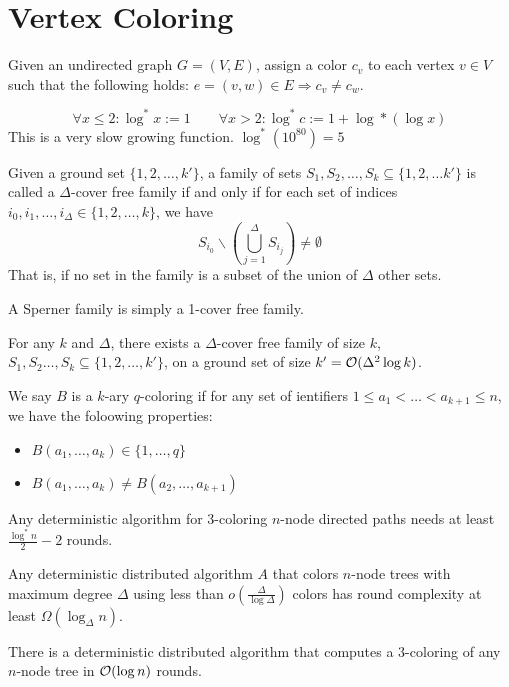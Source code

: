 \documentclass[11pt, oneside]{book}   						%
\begin{document}
\section{Vertex Coloring}
\begin{mydef} Given an undirected graph $G=(V,E)$, assign a color $c_v$ to each vertex $v \in V$ such that the following holds: $e=(v,w) \in E \Rightarrow c_v \neq c_w$.\end{mydef}
\begin{mydef}[$\log^*$] $$\forall x\le 2: \log^*x :=1 \qquad \forall x > 2: \log^*c:= 1+\log*(\log x)$$
This is a very slow growing function. $\log^*(10^{80}) = 5$\end{mydef}
\begin{mydef} Given a ground set $\{1,2, \hdots, k'\}$, a family of sets $S_1,S_2,\hdots,S_k\subseteq\{1,2,\hdots k'\}$ is called a $\Delta$-cover free family if and only if for each set of indices $i_0,i_1,\hdots, i_\Delta\in \{1,2,\hdots,k\}$, we have 
	$$S_{i_0}\backslash \left(\bigcup_{j=1}^\Delta S_{i_j}\right)\neq \emptyset$$
That is, if no set in the family is a subset of the union of $\Delta$ other sets.\end{mydef}
\begin{mydef} A Sperner family is simply a 1-cover free family.\end{mydef}
\begin{mythm}For any $k$ and $\Delta$, there exists a $\Delta$-cover free family of size $k$, $S_1, S_2\hdots,S_k \subseteq\{1,2,\hdots, k'\}$, on a ground set of size $k'=\mathcal{O}(\Delta^2\log k)$.\end{mythm}
\begin{mydef} We say $B$ is a $k$-ary $q$-coloring if for any set of ientifiers $1\le a_1<\hdots<a_{k+1}\le n$, we have the foloowing properties:
\begin{itemize}
	\item $B(a_1,\hdots, a_k)\in \{1,\hdots, q\}$
	\item $B(a_1, \hdots, a_k)\neq B(a_2,\hdots, a_{k+1})$
\end{itemize}\end{mydef}
\begin{mythm} Any deterministic algorithm for 3-coloring $n$-node directed paths needs at least $\frac{\log^*n}{2}-2$ rounds.\end{mythm}
\begin{mythm} Any deterministic distributed algorithm $A$ that colors $n$-node trees with maximum degree $\Delta$ using less than $o(\frac{\Delta}{\log\Delta})$ colors has round complexity at least $\Omega(\log_\Delta n)$.\end{mythm}
\begin{mythm} There is a deterministic distributed algorithm that computes a 3-coloring of any $n$-node tree in $\mathcal{O}(\log n)$ rounds.\end{mythm}
\end{document}
